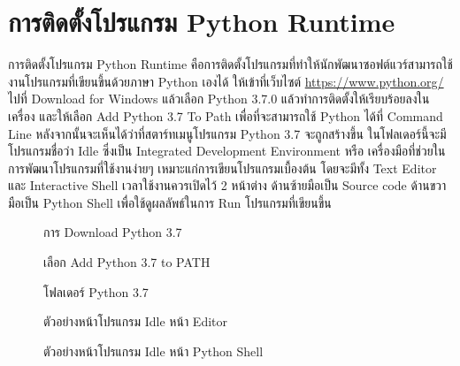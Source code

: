 \section{การติดตั้งโปรแกรม Python Runtime}

การติดตั้งโปรแกรม Python Runtime คือการติดตั้งโปรแกรมที่ทำให้นักพัฒนาซอฟต์แวร์สามารถใช้งานโปรแกรมที่เขียนขึ้นด้วยภาษา Python เองได้ ให้เข้าที่เว็บไซต์ \url{https://www.python.org/} \cite{Pyt19} ไปที่ Download for Windows แล้วเลือก Python 3.7.0 แล้วทำการติดตั้งให้เรียบร้อยลงในเครื่อง และให้เลือก Add Python 3.7 To Path เพื่อที่จะสามารถใช้ Python ได้ที่ Command Line หลังจากนั้นจะเห็นได้ว่าที่สตาร์ทเมนูโปรแกรม Python 3.7 จะถูกสร้างขึ้น ในโฟลเดอร์นี้จะมีโปรแกรมชื่อว่า Idle ซึ่งเป็น Integrated Development Environment หรือ เครื่องมือที่ช่วยในการพัฒนาโปรแกรมที่ใช้งานง่ายๆ เหมาะแก่การเขียนโปรแกรมเบื้องต้น โดยจะมีทั้ง Text Editor และ Interactive Shell เวลาใช้งานควรเปิดไว้ 2 หน้าต่าง ด้านซ้ายมือเป็น Source code ด้านขวามือเป็น Python Shell เพื่อใช้ดูผลลัพธ์ในการ Run โปรแกรมที่เขียนขึ้น

\begin{figure}[h]
\caption{การ Download Python 3.7}
\end{figure}

\begin{figure}[h]
\caption{เลือก Add Python 3.7 to PATH}
\end{figure}


\begin{figure}[h]
\caption{โฟลเดอร์ Python 3.7 }
\end{figure}


\begin{figure}[h]
\caption{ตัวอย่างหน้าโปรแกรม Idle หน้า Editor}
\end{figure}

\begin{figure}[h]
\caption{ตัวอย่างหน้าโปรแกรม Idle หน้า Python Shell}
\end{figure}






